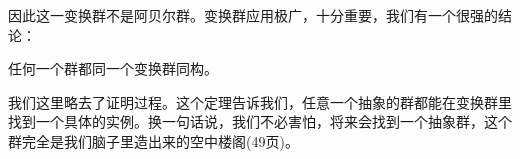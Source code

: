 \documentclass[b5paper]{ctexart}
\begin{document}
因此这一变换群不是阿贝尔群。变换群应用极广，十分重要，我们有一个很强的结论：

\begin{theorem}
任何一个群都同一个变换群同构。
\end{theorem}

我们这里略去了证明过程。这个定理告诉我们，任意一个抽象的群都能在变换群里找到一个具体的实例。换一句话说，我们不必害怕，将来会找到一个抽象群，这个群完全是我们脑子里造出来的空中楼阁\cite{ZhangHeRui1978}(49页)。

\begin{Exercise}\label{ex:group-rules}
\end{Exercise}
\end{document}
